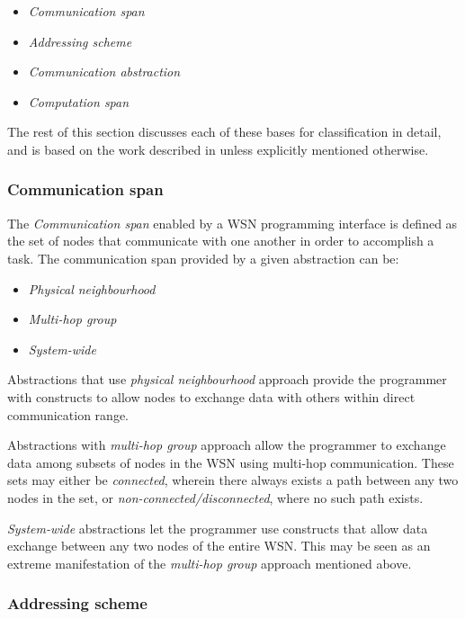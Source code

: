 \begin{itemize}
  \item \emph{Communication span}
  \item \emph{Addressing scheme}
  \item \emph{Communication abstraction}
  \item \emph{Computation span}
\end{itemize}

The rest of this section discusses each of these bases for classification in
detail, and is based on the work described in \cite{mottola_middleware:2008}
unless explicitly mentioned otherwise.

\subsubsection{Communication span}

The \emph{Communication span} enabled by a WSN programming interface is defined
as the set of nodes that communicate with one another in order to accomplish a
task. The communication span provided by a given abstraction can be:
\begin{itemize}
  \item \emph{Physical neighbourhood}
  \item \emph{Multi-hop group}
  \item \emph{System-wide}
\end{itemize}

Abstractions that use \emph{physical neighbourhood} approach provide
  the programmer with constructs to allow nodes to exchange data with others
  within direct communication range.
  
Abstractions with \emph{multi-hop group} approach allow the
  programmer to exchange data among subsets of nodes in the WSN using
  multi-hop communication. These sets may either be
  \emph{connected}, wherein there always exists a path between any two nodes in
  the set, or \emph{non-connected/disconnected}, where no such path
  exists.

\emph{System-wide} abstractions let the
  programmer use constructs that allow data exchange between any two nodes
  of the entire WSN. This may be seen as an extreme manifestation of the
  \emph{multi-hop group} approach mentioned above.

\subsubsection{Addressing scheme}

